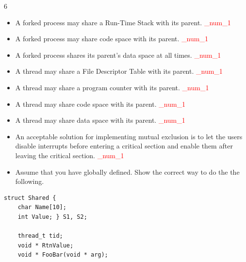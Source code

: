 \documentclass[9pt,landscape]{memoir}
\newcommand{\answer}[1]{\textcolor{red}{_num_1}}
\begin{document}
\raggedright
\footnotesize
\begin{multicols}{6}

\setlength{\premulticols}{1pt}
\setlength{\postmulticols}{1pt}
\setlength{\multicolsep}{1pt}
\setlength{\columnsep}{2pt}
\tiny

\begin{itemize}
    \item A forked process may share a Run-Time Stack with its parent. \answer{False.}
    \item A forked process may share code space with its parent. \answer{True.}
    \item A forked process shares its parent's data space at all times. \answer{False.}
    \item A thread may share a File Descriptor Table with its parent. \answer{True.}
    \item A thread may share a program counter with its parent. \answer{False.}
    \item A thread may share code space with its parent. \answer{True.}
    \item A thread may share data space with its parent. \answer{True.}
    \item An acceptable solution for implementing mutual exclusion is to let the users disable interrupts before entering a critical section and enable them after leaving the critical section. \answer{False.}
    \item Assume that you have globally defined. Show the correct way to do the the following.
\end{itemize}
\begin{lstlisting}[style=cC++,aboveskip=1pt,belowskip=1pt]
    struct Shared {
    char Name[10];
    int Value; } S1, S2;

    thread_t tid;
    void * RtnValue;
    void * FooBar(void * arg);
\end{lstlisting}


\end{multicols}
\end{document}
